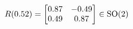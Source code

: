 \documentclass[preview]{standalone}
\begin{document}
\begin{align*}
\special{dvisvgm:raw <g id='unique000'>}R(0.52) = \begin{bmatrix} 0.87 & -0.49 \\ 0.49 & 0.87 \end{bmatrix} \in \text{SO}(2)\special{dvisvgm:raw </g>}
\end{align*}
\end{document}
